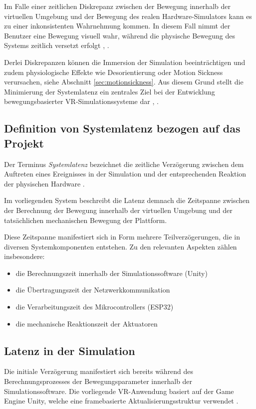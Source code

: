 Im Falle einer zeitlichen Diskrepanz zwischen der Bewegung innerhalb der virtuellen Umgebung und der Bewegung des realen Hardware-Simulators kann es zu einer inkonsistenten Wahrnehmung kommen. In diesem Fall nimmt der Benutzer eine Bewegung visuell wahr, während die physische Bewegung des Systems zeitlich versetzt erfolgt \cite{Slater2016}, \cite{LaValle2023}.

Derlei Diskrepanzen können die Immersion der Simulation beeinträchtigen und zudem physiologische Effekte wie Desorientierung oder Motion Sickness verursachen, siehe Abschnitt \ref{sec:motionsickness}. Aus diesem Grund stellt die Minimierung der Systemlatenz ein zentrales Ziel bei der Entwicklung bewegungsbasierter VR-Simulationssysteme dar \cite{Slater2016}, \cite{LaValle2023}.

\subsection{Definition von Systemlatenz bezogen auf das Projekt}
Der Terminus \emph{Systemlatenz} bezeichnet die zeitliche Verzögerung zwischen dem Auftreten eines Ereignisses in der Simulation und der entsprechenden Reaktion der physischen Hardware \cite{LaValle2023}.

Im vorliegenden System beschreibt die Latenz demnach die Zeitspanne zwischen der Berechnung der Bewegung innerhalb der virtuellen Umgebung und der tatsächlichen mechanischen Bewegung der Plattform. 

Diese Zeitspanne manifestiert sich in Form mehrere Teilverzögerungen, die in diversen Systemkomponenten entstehen. Zu den relevanten Aspekten zählen insbesondere:
\begin{itemize}
        \item die Berechnungszeit innerhalb der Simulationssoftware (Unity)
        \item die Übertragungszeit der Netzwerkkommunikation
        \item die Verarbeitungszeit des Mikrocontrollers (ESP32)
        \item die mechanische Reaktionszeit der Aktuatoren
\end{itemize}

\subsection{Latenz in der Simulation}
Die initiale Verzögerung manifestiert sich bereits während des Berechnungsprozesses der Bewegungsparameter innerhalb der Simulationssoftware. Die vorliegende VR-Anwendung basiert auf der Game Engine Unity, welche eine framebasierte Aktualisierungsstruktur verwendet \cite{Unity13}.

